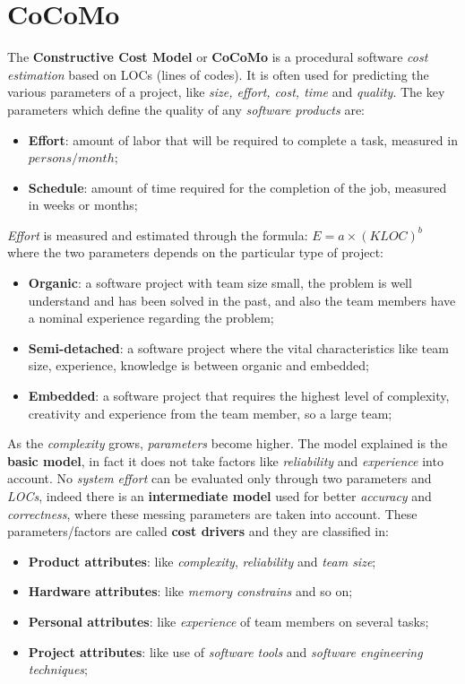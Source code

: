 \documentclass{article}
\begin{document}
\section{CoCoMo}
The \textbf{Constructive Cost Model} or \textbf{CoCoMo} is a procedural software \emph{cost estimation} based on LOCs (lines of codes). It is often used  for predicting the various parameters of a project, like \emph{size, effort, cost, time} and \emph{quality}. The key parameters which define the quality of any \emph{software products} are:
\begin{itemize}
\item \textbf{Effort}: amount of labor that will be required to complete a task, measured in $persons/month$;
\item \textbf{Schedule}: amount of time required for the completion of the job, measured in weeks or months;
\end{itemize}
\emph{Effort} is measured and estimated through the formula: $E = a \times (KLOC)^b$ where the two parameters depends on the particular type of project:
\begin{itemize}
\item \textbf{Organic}: a software project with team size small, the problem is well understand and has been solved in the past, and also the team members have a nominal experience regarding the problem;
\item \textbf{Semi-detached}: a software project where the vital characteristics like team size, experience, knowledge is between organic and embedded;
\item \textbf{Embedded}: a software project that requires the highest level of complexity, creativity and experience from the team member, so a large team;
\end{itemize}
As the \emph{complexity} grows, \emph{parameters} become higher. The model explained is the \textbf{basic model}, in fact it does not take factors like \emph{reliability} and \emph{experience} into account. No \emph{system effort} can be evaluated only through two parameters and \emph{LOCs}, indeed there is an \textbf{intermediate model} used for better \emph{accuracy} and \emph{correctness}, where these messing parameters are taken into account. These parameters/factors are called \textbf{cost drivers} and they are classified in:
\begin{itemize}
\item \textbf{Product attributes}: like \emph{complexity}, \emph{reliability} and \emph{team size};
\item \textbf{Hardware attributes}: like \emph{memory constrains} and so on;
\item \textbf{Personal attributes}: like \emph{experience} of team members on several tasks;
\item \textbf{Project attributes}: like use of \emph{software tools} and \emph{software engineering techniques};
\end{itemize}
\end{document}
